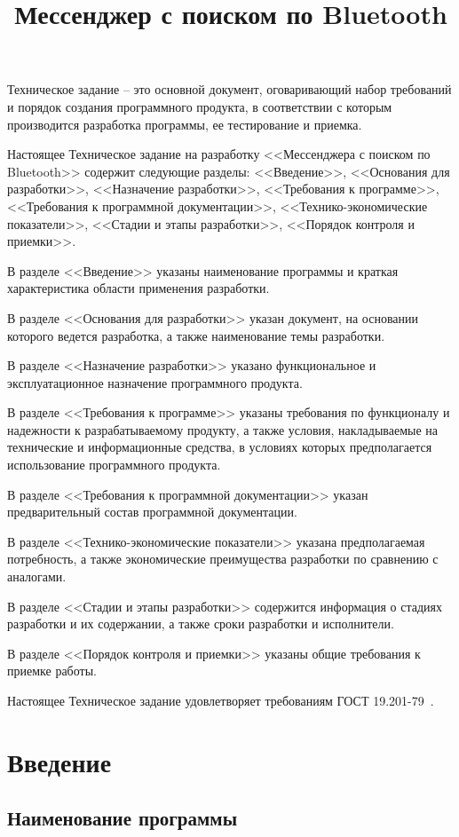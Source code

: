 \documentclass[techtask]{espd}
\title{Мессенджер с поиском по Bluetooth}
\begin{document}
\annotation
Техническое задание -- это основной документ, оговаривающий набор требований и порядок создания программного продукта, в соответствии с которым производится разработка программы, ее тестирование и приемка.

Настоящее Техническое задание на разработку <<Мессенджера с поиском по Bluetooth>> содержит следующие разделы: <<Введение>>, <<Основания для разработки>>, <<Назначение разработки>>, <<Требования к программе>>, <<Требования к программной документации>>, <<Технико-экономические показатели>>, <<Стадии и этапы разработки>>, <<Порядок контроля и приемки>>.

В разделе <<Введение>> указаны наименование программы и краткая характеристика области применения разработки.

В разделе <<Основания для разработки>> указан документ, на основании которого ведется разработка, а также наименование темы разработки.

В разделе <<Назначение разработки>> указано функциональное и эксплуатационное назначение программного продукта.

В разделе <<Требования к программе>> указаны требования по функционалу и надежности к разрабатываемому продукту, а также условия, накладываемые на технические и информационные средства, в условиях которых предполагается использование программного продукта.

В разделе <<Требования к программной документации>> указан предварительный состав программной документации.

В разделе <<Технико-экономические показатели>> указана предполагаемая потребность, а также экономические преимущества разработки по сравнению с аналогами.

В разделе <<Стадии и этапы разработки>> содержится информация о стадиях разработки и их содержании, а также сроки разработки и исполнители.

В разделе <<Порядок контроля и приемки>> указаны общие требования к приемке работы.

Настоящее Техническое задание удовлетворяет требованиям ГОСТ 19.201-79~\cite{espd201}.

\tableofcontents

\section{Введение}
\subsection{Наименование программы}
\end{document}
